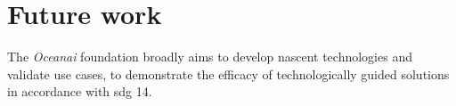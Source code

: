 \section{Future work}
The \emph{Oceanai} foundation broadly aims to develop nascent technologies and validate use cases, to demonstrate the efficacy of technologically guided solutions in accordance with \gls{sdg} 14.
